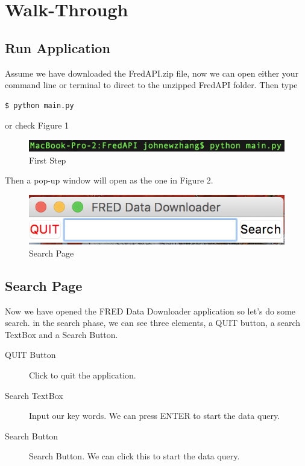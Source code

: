\documentclass[final,12pt]{elsarticle}
\begin{document}
\section{Walk-Through}
\subsection{Run Application}
Assume we have downloaded the FredAPI.zip file, now we can open either your command line or terminal to direct to the unzipped FredAPI folder. Then type
\begin{verbatim}
$ python main.py
\end{verbatim}
or check Figure 1 
\begin{figure}[h]
\centering\includegraphics[width=0.6\linewidth]{img/first_step.png}
\caption{First Step}
\end{figure}

Then a pop-up window will open as the one in Figure 2. 

\begin{figure}[h]
\centering\includegraphics[width=0.6\linewidth]{img/search_page.png}
\caption{Search Page}
\end{figure}

\newpage

\subsection{Search Page}
Now we have opened the FRED Data Downloader application so let's do some search. in the search phase, we can see three elements, a QUIT button, a search TextBox and a Search Button. 
\begin{description}
\item[QUIT Button] Click to quit the application.
\item[Search TextBox] Input our key words. We can press ENTER to start the data query.
\item[Search Button] Search Button. We can click this to start the data query.
\end{description}
\end{document}
